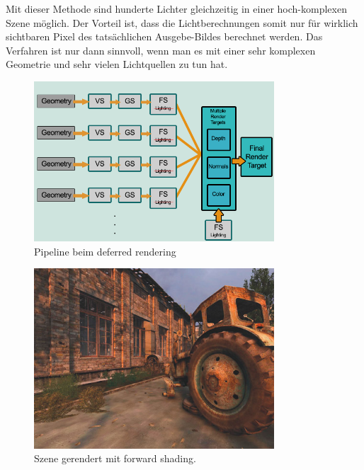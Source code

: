 Mit dieser Methode sind hunderte Lichter gleichzeitig in einer hoch-komplexen Szene möglich.
Der Vorteil ist, dass die Lichtberechnungen somit nur für wirklich sichtbaren Pixel des tatsächlichen Ausgebe-Bildes  berechnet werden.
Das Verfahren ist nur dann sinnvoll, wenn man es mit einer sehr komplexen Geometrie und sehr vielen Lichtquellen zu tun hat. 

\begin{figure}[H]
    \centering
    \includegraphics[width=0.8\textwidth]{images/deferred_v2.png}
    \caption{Pipeline beim deferred rendering} %
    \label{fig:defferedshading}
\end{figure}



\begin{figure}[H]
    \centering
    \includegraphics[width=0.8\textwidth]{images/deferred_shading_off.jpg}
    \caption{Szene gerendert mit forward shading. } %
    \label{fig:defferedshading}
\end{figure}



